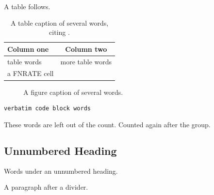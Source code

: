 A table follows.

\begin{table}[htbp]
\centering
\caption{A table caption of several words, citing \cite{one}.}
\label{tab:demo}
\small
\begin{tabular}{@{}lc@{}}
\toprule
Column one & Column two \\
\midrule
table words & more table words \\
a \gls{FNRATE} cell & \cite{one} \\
\bottomrule
\end{tabular}
\end{table}
\begin{figure}[htbp]
\centering
{}
\caption{A figure caption of several words.}
\label{fig:demo}
\end{figure}
\begin{handtyped}[htbp]
\caption{A listing caption of several words}
\label{lst:bench}
\end{handtyped}
\begin{verbatim}
verbatim code block words
\end{verbatim}

\FloatBarrier

{\wordcountoff These words are left out of the count.} Counted again after the group.

\subsection*{Unnumbered Heading}
\label{sec:floats:unnumbered}

Words under an unnumbered heading.


A paragraph after a divider.
\stopwordcount
